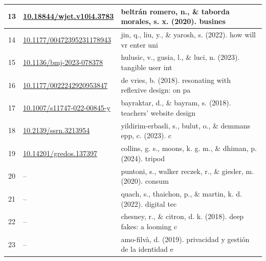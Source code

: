 {\begin{longtable}{|c|p{4.0cm}|p{8.2cm}|}
\hline
13 & {\scriptsize \url{10.18844/wjet.v10i4.3783}} & {\small beltrán romero, n., \& taborda morales, s. x. (2020). busines} \\
\hline
14 & {\scriptsize \url{10.1177/00472395231178943}} & {\small jin, q., liu, y., \& yarosh, s. (2022). how will vr enter uni} \\
\hline
15 & {\scriptsize \url{10.1136/bmj-2023-078378}} & {\small hulusic, v., gusia, l., \& luci, n. (2023). tangible user int} \\
\hline
16 & {\scriptsize \url{10.1177/0022242920953847}} & {\small de vries, b. (2018). resonating with reflexive design: on pa} \\
\hline
17 & {\scriptsize \url{10.1007/s11747-022-00845-y}} & {\small bayraktar, d., \& bayram, s. (2018). teachers' website design} \\
\hline
18 & {\scriptsize \url{10.2139/ssrn.3213954}} & {\small yildirim-erbasli, s., bulut, o., \& demmans epp, c. (2023). c} \\
\hline
19 & {\scriptsize \url{10.14201/gredos.137397}} & {\small collins, g. s., moons, k. g. m., \& dhiman, p. (2024). tripod} \\
\hline
20 & {\scriptsize --} & {\small puntoni, s., walker reczek, r., \& giesler, m. (2020). consum} \\
\hline
21 & {\scriptsize --} & {\small quach, s., thaichon, p., \& martin, k. d. (2022). digital tec} \\
\hline
22 & {\scriptsize --} & {\small chesney, r., \& citron, d. k. (2018). deep fakes: a looming c} \\
\hline
23 & {\scriptsize --} & {\small amo-filvà, d. (2019). privacidad y gestión de la identidad e} \\
\hline
\end{longtable}}
